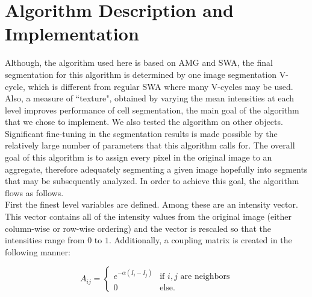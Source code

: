 \documentclass[12pt]{article}%
\begin{document}
\section{Algorithm Description and Implementation}
Although, the algorithm used here is based on AMG and SWA, the final segmentation for this algorithm is determined by one image segmentation V-cycle, which is different from regular SWA where many V-cycles may be used.  Also, a measure of ``texture", obtained by varying the mean intensities at each level improves performance of cell segmentation, the main goal of the algorithm that we chose to implement. We also tested the algorithm on other objects. Significant fine-tuning in the segmentation results is made possible by the relatively large number of parameters that this algorithm calls for. The overall goal of this algorithm is to assign every pixel in the original image to an aggregate, therefore adequately segmenting a given image hopefully into segments that may be subsequently analyzed. In order to achieve this goal, the algorithm flows as follows.
\vspace{5mm}\\
First the finest level variables are defined. Among these are an intensity vector. This vector contains all of the intensity values from the original image (either column-wise or row-wise ordering) and the vector is rescaled so that the intensities range from $0$ to $1$.  Additionally, a coupling matrix is created in the following manner: 

$$ A_{ij} = \begin{cases} e^{-\alpha(I_i-I_j)} &\mbox{if } i, j \mbox{\ \ are neighbors} \\ 0 & \mbox{else. } \end{cases} $$ 
\end{document}
